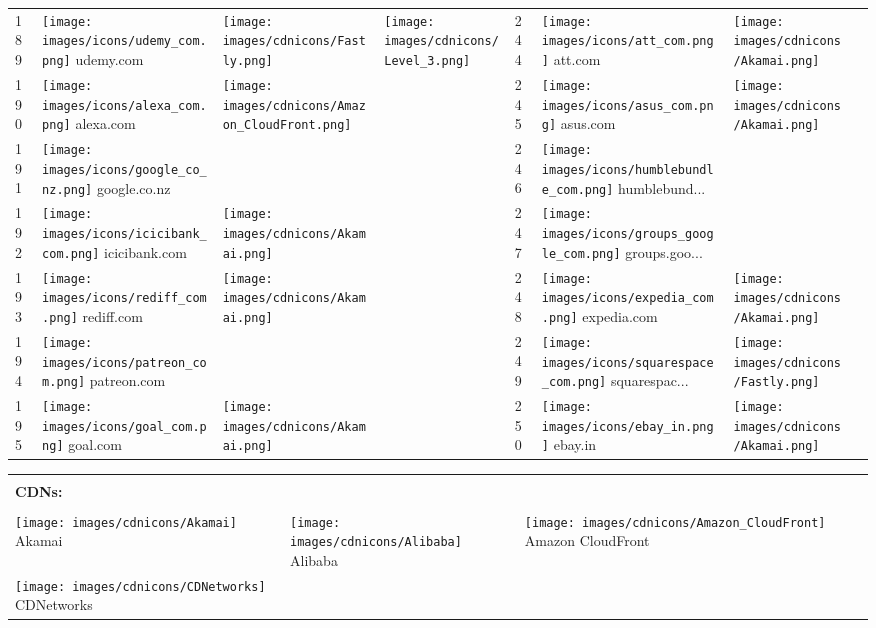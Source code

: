 \begin{table}[]
\begin{tabular}{|llll|llll|}
189 & \texttt{[image: images/icons/udemy\_com.png]} udemy.com & \texttt{[image: images/cdnicons/Fastly.png]} & \texttt{[image: images/cdnicons/Level\_3.png]} & 244 & \texttt{[image: images/icons/att\_com.png]} att.com & \texttt{[image: images/cdnicons/Akamai.png]} & \\
190 & \texttt{[image: images/icons/alexa\_com.png]} alexa.com & \texttt{[image: images/cdnicons/Amazon\_CloudFront.png]} & & 245 & \texttt{[image: images/icons/asus\_com.png]} asus.com & \texttt{[image: images/cdnicons/Akamai.png]} & \\
191 & \texttt{[image: images/icons/google\_co\_nz.png]} google.co.nz & & & 246 & \texttt{[image: images/icons/humblebundle\_com.png]} humblebund... & & \\
192 & \texttt{[image: images/icons/icicibank\_com.png]} icicibank.com & \texttt{[image: images/cdnicons/Akamai.png]} & & 247 & \texttt{[image: images/icons/groups\_google\_com.png]} groups.goo... & & \\
193 & \texttt{[image: images/icons/rediff\_com.png]} rediff.com & \texttt{[image: images/cdnicons/Akamai.png]} & & 248 & \texttt{[image: images/icons/expedia\_com.png]} expedia.com & \texttt{[image: images/cdnicons/Akamai.png]} & \\
194 & \texttt{[image: images/icons/patreon\_com.png]} patreon.com & & & 249 & \texttt{[image: images/icons/squarespace\_com.png]} squarespac... & \texttt{[image: images/cdnicons/Fastly.png]} & \\
195 & \texttt{[image: images/icons/goal\_com.png]} goal.com & \texttt{[image: images/cdnicons/Akamai.png]} & & 250 & \texttt{[image: images/icons/ebay\_in.png]} ebay.in & \texttt{[image: images/cdnicons/Akamai.png]} & \\
\hline
\end{tabular}
\begin{tabular}{|lll|}
&& \\
\textbf{CDNs:} && \\
&& \\
\texttt{[image: images/cdnicons/Akamai]} Akamai &
\texttt{[image: images/cdnicons/Alibaba]} Alibaba &
\texttt{[image: images/cdnicons/Amazon\_CloudFront]} Amazon CloudFront \\
\texttt{[image: images/cdnicons/CDNetworks]} CDNetworks &

\end{tabular}
\end{table}

